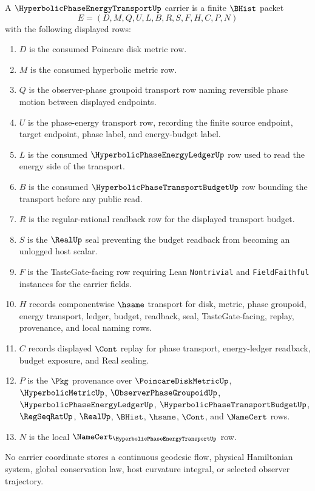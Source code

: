 \begin{definition}
\label{def:hyperbolic-phase-energy-transport-carrier}
A $\HyperbolicPhaseEnergyTransportUp$ carrier is a finite $\BHist$ packet
$$
E=(D,M,Q,U,L,B,R,S,F,H,C,P,N)
$$
with the following displayed rows:
\begin{enumerate}
\item $D$ is the consumed Poincare disk metric row.
\item $M$ is the consumed hyperbolic metric row.
\item $Q$ is the observer-phase groupoid transport row naming reversible phase motion between displayed endpoints.
\item $U$ is the phase-energy transport row, recording the finite source endpoint, target endpoint, phase label, and energy-budget label.
\item $L$ is the consumed $\HyperbolicPhaseEnergyLedgerUp$ row used to read the energy side of the transport.
\item $B$ is the consumed $\HyperbolicPhaseTransportBudgetUp$ row bounding the transport before any public read.
\item $R$ is the regular-rational readback row for the displayed transport budget.
\item $S$ is the $\RealUp$ seal preventing the budget readback from becoming an unlogged host scalar.
\item $F$ is the TasteGate-facing row requiring Lean \texttt{Nontrivial} and \texttt{FieldFaithful} instances for the carrier fields.
\item $H$ records componentwise $\hsame$ transport for disk, metric, phase groupoid, energy transport, ledger, budget, readback, seal, TasteGate-facing, replay, provenance, and local naming rows.
\item $C$ records displayed $\Cont$ replay for phase transport, energy-ledger readback, budget exposure, and Real sealing.
\item $P$ is the $\Pkg$ provenance over $\PoincareDiskMetricUp$, $\HyperbolicMetricUp$, $\ObserverPhaseGroupoidUp$, $\HyperbolicPhaseEnergyLedgerUp$, $\HyperbolicPhaseTransportBudgetUp$, $\RegSeqRatUp$, $\RealUp$, $\BHist$, $\hsame$, $\Cont$, and $\NameCert$ rows.
\item $N$ is the local $\NameCert_{\HyperbolicPhaseEnergyTransportUp}$ row.
\end{enumerate}
No carrier coordinate stores a continuous geodesic flow, physical Hamiltonian system, global conservation law, host curvature integral, or selected observer trajectory.
\end{definition}


